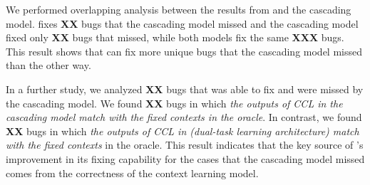 We performed overlapping analysis between the results
from {\tool} and the cascading model. {\tool} fixes {\bf XX} bugs that
the cascading model missed and the cascading model fixed only {\bf XX}
bugs that {\tool} missed, while both models fix the same {\bf XXX}
bugs. This result shows that {\tool} can fix more unique bugs
that the cascading model missed than the other way.

In a further study, we analyzed {\bf XX} bugs that {\tool} was able
to fix and were missed by the cascading model. We found {\bf XX} bugs
in which {\em the outputs of CCL in the cascading model match with the
  fixed contexts in the oracle}. In contrast, we found {\bf XX} bugs
in which {\em the outputs of CCL in {\tool} (dual-task learning
  architecture) match with the fixed contexts} in the oracle. This
result indicates that the key source of {\tool}'s improvement in its
fixing capability for the cases that the cascading model missed comes
from the correctness of the context learning model.






